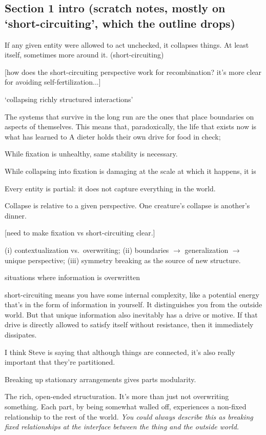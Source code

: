 \subsection{Section 1 intro (scratch notes, mostly on `short-circuiting', which the outline drops)}

If any given entity were allowed to act unchecked, it collapses things. At least itself, sometimes more around it. (short-circuiting)

[how does the short-circuiting perspective work for recombination? it's more clear for avoiding self-fertilization...]

`collapsing richly structured interactions'

The systems that survive in the long run are the ones that place boundaries on aspects of themselves. This means that, paradoxically, the life that exists now is what has learned to  A dieter holds their own drive for food in check;

While fixation is unhealthy, same stability is necessary.

While collapsing into fixation is damaging at the scale at which it happens, it is

Every entity is partial: it does not capture everything in the world.

Collapse is relative to a given perspective. One creature's collapse is another's dinner.

[need to make fixation vs short-circuiting clear.]

(i) contextualization vs.\ overwriting; (ii) boundaries $\rightarrow$ generalization $\rightarrow$ unique perspective; (iii) symmetry breaking as the source of new structure.

situations where information is overwritten

short-circuiting means you have some internal complexity, like a potential energy that's in the form of information in yourself. It distinguishes you from the outside world. But that unique information also inevitably has a drive or motive. If that drive is directly allowed to satisfy itself without resistance, then it immediately dissipates.

I think Steve is saying that although things are connected, it's also really important that they're partitioned.

Breaking up stationary arrangements gives parts modularity.

The rich, open-ended structuration. It's more than just not overwriting something. Each part, by being somewhat walled off, experiences a non-fixed relationship to the rest of the world. \textit{You could always describe this as breaking fixed relationships at the interface between the thing and the outside world.}


